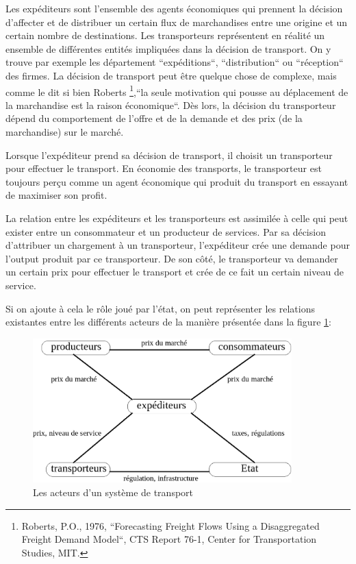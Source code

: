 Les expéditeurs sont l'ensemble des agents économiques qui prennent la décision
d'affecter et de distribuer un certain flux de marchandises entre une origine et
un certain nombre de destinations. Les transporteurs représentent en réalité un
ensemble de différentes entités impliquées dans la décision de transport. On y
trouve par exemple les département ``expéditions``, ``distribution`` ou
``réception`` des firmes. La décision de transport peut être quelque chose de
complexe, mais comme le dit si bien Roberts \footnote{Roberts, P.O., 1976,
``Forecasting Freight Flows Using a Disaggregated Freight Demand Model``, CTS
Report 76-1, Center for Transportation Studies, MIT.},``la seule motivation qui
pousse au déplacement de la marchandise est la raison économique``. Dès lors, la
décision du transporteur dépend du comportement de l'offre et de la demande et
des prix (de la marchan\-dise) sur le marché.

Lorsque l'expéditeur prend sa décision de transport, il choisit un
transporteur pour effectuer le transport. En économie des
transports, le transporteur est toujours perçu comme un agent
économique qui produit du transport en essayant de maximiser son
profit.

La relation entre les expéditeurs et les transporteurs est
assimilée à celle qui peut exister entre un consommateur et un
producteur de services. Par sa décision d'attribuer un chargement à
un transporteur, l'expéditeur crée une demande pour l'output
produit par ce transporteur. De son côté, le transporteur va
demander un certain prix pour effectuer le transport et crée de ce
fait un certain niveau de service.

Si on ajoute à cela le rôle joué par l'état, on peut représenter les relations
existantes entre les différents acteurs de la manière présentée dans la figure
\ref{f2_3}:

\begin{figure}[htbp]
\centerline{\includegraphics[width=10cm]{f2_3.png}}
\caption{\label{f2_3} Les acteurs d'un syst\`eme de transport}
\end{figure}


